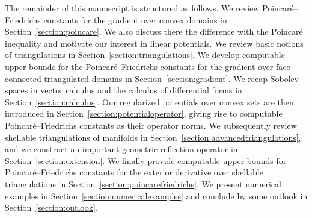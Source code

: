 \documentclass[10pt,a4paper]{article}
\begin{document}
The remainder of this manuscript is structured as follows.
We review Poincar\'e--Friedrichs constants for the gradient over convex domains in Section~\ref{section:poincare}. 
We also discuss there the difference with the Poincar\'e inequality and motivate our interest in linear potentials.
We review basic notions of triangulations in Section~\ref{section:triangulations}.
We develop computable upper bounds for the Poincar\'e--Friedrichs constants for the gradient over face-connected triangulated domains in Section~\ref{section:gradient}.
We recap Sobolev spaces in vector calculus and the calculus of differential forms in Section~\ref{section:calculus}. 
Our regularized potentials over convex sets are then introduced in Section~\ref{section:potentialoperator}, 
giving rise to computable Poincar\'e--Friedrichs constants as their operator norms. 
We subsequently review shellable triangulations of manifolds in Section~\ref{section:advancedtriangulations},
and we construct an important geometric reflection operator in Section~\ref{section:extension}. 
We finally provide computable upper bounds for Poincar\'e--Friedrichs constants for the exterior derivative over shellable triangulations in Section~\ref{section:poincarefriedrichs}.
We present numerical examples in Section~\ref{section:numericalexamples} and conclude by some outlook in Section~\ref{section:outlook}. 
\end{document}
